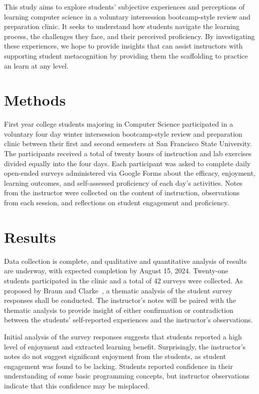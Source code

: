 \documentclass[12pt]{article}
\begin{document}
This study aims to explore students' subjective experiences and perceptions of
learning computer science in a voluntary intersession bootcamp-style review and
preparation clinic.  It seeks to understand how students navigate the learning
process, the challenges they face, and their perceived proficiency.  By
investigating these experiences, we hope to provide insights that can assist
instructors with supporting student metacognition by providing them the
scaffolding to practice an learn at any level.

\section{Methods}
First year college students majoring in Computer Science participated
in a voluntary four day winter intersession bootcamp-style review and
preparation clinic between their first and second semesters at San Francisco
State University. The participants received a total of twenty hours of
instruction and lab exercises divided equally into the four days.  Each
participant was asked to complete daily open-ended surveys administered via
Google Forms about the efficacy, enjoyment, learning outcomes, and self-assessed
proficiency of each day's activities. Notes from the instructor were collected
on the content of instruction, observations from each session, and reflections
on student engagement and proficiency.

\section{Results}
Data collection is complete, and qualitative and quantitative analysis of
results are underway, with expected completion by August 15, 2024.  Twenty-one
students participated in the clinic and a total of 42 surveys were collected.
As proposed by Braun and Clarke~\cite{braun}, a thematic analysis of the student
survey responses shall be conducted.  The instructor's notes will be paired with
the thematic analysis to provide insight of either confirmation or contradiction
between the students' self-reported experiences and the instructor's
observations.

Initial analysis of the survey responses suggests that students reported a high
level of enjoyment and extracted learning benefit.  Surprisingly, the
instructor's notes do not suggest significant enjoyment from the students, as
student engagement was found to be lacking.  Students reported confidence in
their understanding of some basic programming concepts, but instructor
observations indicate that this confidence may be misplaced.
\end{document}
